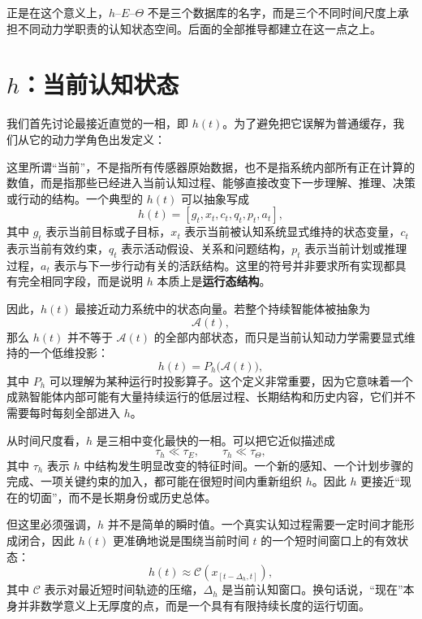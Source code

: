 正是在这个意义上，$h$--$E$--$\Theta$ 不是三个数据库的名字，而是三个不同时间尺度上承担不同动力学职责的认知状态空间。后面的全部推导都建立在这一点之上。

\section{$h$：当前认知状态}

我们首先讨论最接近直觉的一相，即 $h(t)$。为了避免把它误解为普通缓存，我们从它的动力学角色出发定义：
\begin{statementbox}
\centering
{}
\end{statementbox}

这里所谓“当前”，不是指所有传感器原始数据，也不是指系统内部所有正在计算的数值，而是指那些已经进入当前认知过程、能够直接改变下一步理解、推理、决策或行动的结构。一个典型的 $h(t)$ 可以抽象写成
\[
h(t)=
\left[
g_t,
x_t,
c_t,
q_t,
p_t,
a_t
\right],
\]
其中 $g_t$ 表示当前目标或子目标，$x_t$ 表示当前被认知系统显式维持的状态变量，$c_t$ 表示当前有效约束，$q_t$ 表示活动假设、关系和问题结构，$p_t$ 表示当前计划或推理过程，$a_t$ 表示与下一步行动有关的活跃结构。这里的符号并非要求所有实现都具有完全相同字段，而是说明 $h$ 本质上是\textbf{运行态结构}。

因此，$h(t)$ 最接近动力系统中的状态向量。若整个持续智能体被抽象为
\[
\mathcal{A}(t),
\]
那么 $h(t)$ 并不等于 $\mathcal{A}(t)$ 的全部内部状态，而只是当前认知动力学需要显式维持的一个低维投影：
\[
h(t)
=
P_h\bigl(\mathcal{A}(t)\bigr),
\]
其中 $P_h$ 可以理解为某种运行时投影算子。这个定义非常重要，因为它意味着一个成熟智能体内部可能有大量持续运行的低层过程、长期结构和历史内容，它们并不需要每时每刻全部进入 $h$。

从时间尺度看，$h$ 是三相中变化最快的一相。可以把它近似描述成
\[
\tau_h
\ll
\tau_E,
\qquad
\tau_h
\ll
\tau_\Theta,
\]
其中 $\tau_h$ 表示 $h$ 中结构发生明显改变的特征时间。一个新的感知、一个计划步骤的完成、一项关键约束的加入，都可能在很短时间内重新组织 $h$。因此 $h$ 更接近“现在的切面”，而不是长期身份或历史总体。

但这里必须强调，$h$ 并不是简单的瞬时值。一个真实认知过程需要一定时间才能形成闭合，因此 $h(t)$ 更准确地说是围绕当前时间 $t$ 的一个短时间窗口上的有效状态：
\[
h(t)
\approx
\mathcal{C}
\left(
x_{[t-\Delta_h,t]}
\right),
\]
其中 $\mathcal{C}$ 表示对最近短时间轨迹的压缩，$\Delta_h$ 是当前认知窗口。换句话说，“现在”本身并非数学意义上无厚度的点，而是一个具有有限持续长度的运行切面。

